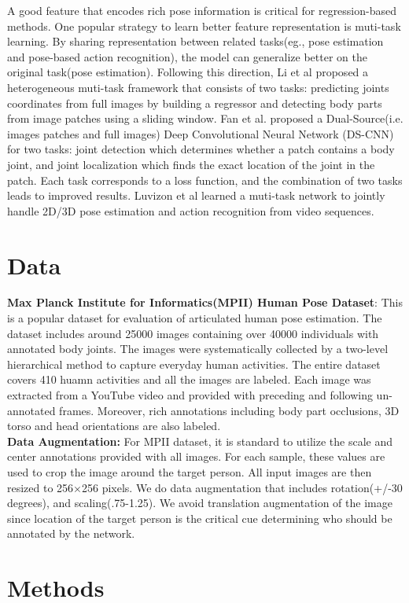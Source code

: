 \documentclass[final]{cvpr}
\begin{document}
\indent A good feature that encodes rich pose information is critical for regression-based methods. One popular strategy to learn better feature representation is muti-task learning. By sharing representation between related tasks(eg., pose estimation and pose-based action recognition), the model can generalize better on the original task(pose estimation). Following this direction, Li et al\cite{li2014heterogeneous} proposed a heterogeneous muti-task framework that consists of two tasks: predicting joints coordinates from full images by building a regressor and detecting body parts from image patches using a sliding window. Fan et al.\cite{fan2015combining} proposed a Dual-Source(i.e. images patches and full images) Deep Convolutional Neural Network (DS-CNN) for two tasks: joint detection which determines whether a patch contains a body joint, and joint localization which finds the exact location of the joint in the patch. Each task corresponds to a loss function, and the combination of two tasks leads to improved results. Luvizon et al\cite{luvizon2019human} learned a muti-task network to jointly handle 2D/3D pose estimation and action recognition from video sequences.
\section{Data}
\noindent \textbf{Max Planck Institute for Informatics(MPII) Human Pose Dataset}: This is a popular dataset for evaluation of articulated human pose estimation. The dataset includes around 25000 images containing over 40000 individuals with annotated body joints. The images were systematically collected by a two-level hierarchical method to capture everyday human activities. The entire dataset covers 410 huamn activities and all the images are labeled. Each image was extracted from a YouTube video and provided with preceding and following un-annotated frames. Moreover, rich annotations including body part occlusions, 3D torso and head orientations are also labeled.\\
\textbf{Data Augmentation:} For MPII dataset, it is standard to utilize the scale and center annotations provided with all images. For each sample, these values are used to crop the image around the target person. All input images are then resized to 256$\times$256 pixels. We do data augmentation that includes rotation(+/-30 degrees), and scaling(.75-1.25). We avoid translation augmentation of the image since location of the target person is the critical cue determining who should be annotated by the network.
\section{Methods}
\end{document}
